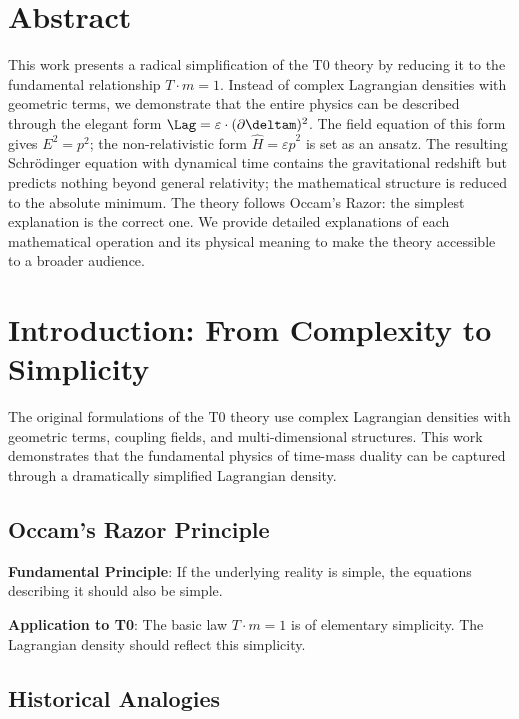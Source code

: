 \hfuzz=200pt
\allowdisplaybreaks

\section*{Abstract}
		This work presents a radical simplification of the T0 theory by reducing it to the fundamental relationship $T \cdot m = 1$. Instead of complex Lagrangian densities with geometric terms, we demonstrate that the entire physics can be described through the elegant form $\Lag = \varepsilon \cdot (\partial \deltam)^2$. The field equation of this form gives $E^2 = p^2$; the non-relativistic form $\hat{H} = \varepsilon \hat{p}^2$ is set as an ansatz. The resulting Schrödinger equation with dynamical time contains the gravitational redshift but predicts nothing beyond general relativity; the mathematical structure is reduced to the absolute minimum. The theory follows Occam's Razor: the simplest explanation is the correct one. We provide detailed explanations of each mathematical operation and its physical meaning to make the theory accessible to a broader audience.

	

	\section{Introduction: From Complexity to Simplicity}
	
	The original formulations of the T0 theory use complex Lagrangian densities with geometric terms, coupling fields, and multi-dimensional structures. This work demonstrates that the fundamental physics of time-mass duality can be captured through a dramatically simplified Lagrangian density.
	
	\subsection{Occam's Razor Principle}
	
	\begin{tcolorbox}[colback=blue!5!white,colframe=blue!75!black,title=Occam's Razor in Physics]
		\textbf{Fundamental Principle}: If the underlying reality is simple, the equations describing it should also be simple.
		
		\textbf{Application to T0}: The basic law $T \cdot m = 1$ is of elementary simplicity. The Lagrangian density should reflect this simplicity.
	\end{tcolorbox}
	
	\subsection{Historical Analogies}
	
